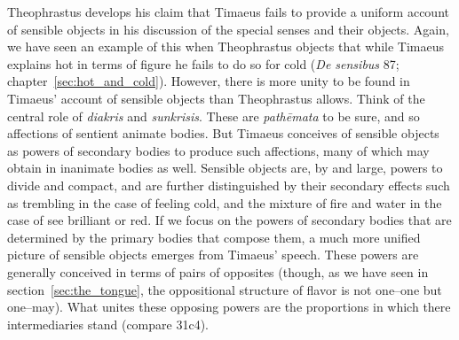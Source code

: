 Theophrastus develops his claim that Timaeus fails to provide a uniform account of sensible objects in his discussion of the special senses and their objects. Again, we have seen an example of this when Theophrastus objects that while Timaeus explains hot in terms of figure he fails to do so for cold (\emph{De sensibus} 87; chapter~\ref{sec:hot_and_cold}). However, there is more unity to be found in Timaeus' account of sensible objects than Theophrastus allows. Think of the central role of \emph{diakris} and \emph{sunkrisis}. These are \emph{pathēmata} to be sure, and so affections of sentient animate bodies. But Timaeus conceives of sensible objects as powers of secondary bodies to produce such affections, many of which may obtain in inanimate bodies as well. Sensible objects are, by and large, powers to divide and compact, and are further distinguished by their secondary effects such as trembling in the case of feeling cold, and the mixture of fire and water in the case of see brilliant or red. If we focus on the powers of secondary bodies that are determined by the primary bodies that compose them, a much more unified picture of sensible objects emerges from Timaeus' speech. These powers are generally conceived in terms of pairs of opposites (though, as we have seen in section~\ref{sec:the_tongue}, the oppositional structure of flavor is not one--one but one--may). What unites these opposing powers are the proportions in which there intermediaries stand (compare 31c4).


